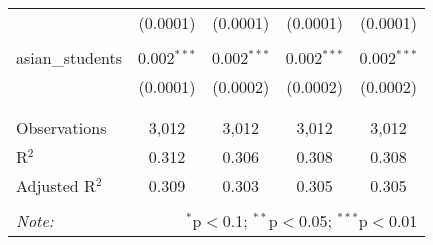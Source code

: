 \begin{table}[!htbp]
\begin{tabular}{@{\extracolsep{-2pt}}lcccc}
  & (0.0001) & (0.0001) & (0.0001) & (0.0001) \\ 
  & & & & \\ 
 asian\_students & 0.002$^{***}$ & 0.002$^{***}$ & 0.002$^{***}$ & 0.002$^{***}$ \\ 
  & (0.0001) & (0.0002) & (0.0002) & (0.0002) \\ 
  & & & & \\ 
\hline \\[-1.8ex] 
Observations & 3,012 & 3,012 & 3,012 & 3,012 \\ 
R$^{2}$ & 0.312 & 0.306 & 0.308 & 0.308 \\ 
Adjusted R$^{2}$ & 0.309 & 0.303 & 0.305 & 0.305 \\ 
\hline 
\hline \\[-1.8ex] 
\textit{Note:}  & \multicolumn{4}{r}{$^{*}$p$<$0.1; $^{**}$p$<$0.05; $^{***}$p$<$0.01} \\ 
\end{tabular} 
\end{table} 
